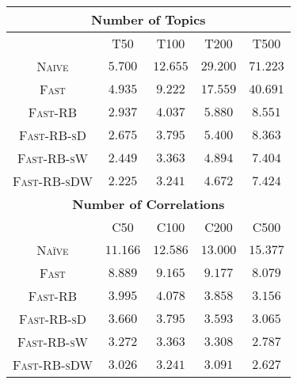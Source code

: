 \centering
  \begin{tabular}{| c || c | c | c | c |}
\hline
\multicolumn{5}{|c|}{{\bf Number of Topics}}\\
\hline
& T50 & T100 & T200 & T500\\
\hline
\scriptsize{\textsc{Naive}} & $5.700$ & $12.655$ & $29.200$ & $71.223$\\
\scriptsize{\textsc{Fast}} & $4.935$ & $9.222$ & $17.559$ & $40.691$\\
\scriptsize{\textsc{Fast-RB}} & $2.937$ & $4.037$ & $5.880$ & $8.551$\\
\scriptsize{\textsc{Fast-RB-sD}} & $2.675$ & $3.795$ & $5.400$ & $8.363$\\
\scriptsize{\textsc{Fast-RB-sW}} & $2.449$ & $3.363$ & $4.894$ & $7.404$\\
\scriptsize{\textsc{Fast-RB-sDW}} & $2.225$ & $3.241$ & $4.672$ & $7.424$\\
\hline
\multicolumn{5}{|c|}{{\bf Number of Correlations}}\\
\hline
& C50 & C100 & C200 & C500\\
\hline
\scriptsize{\textsc{Na\"ive}} & $11.166$ & $12.586$ & $13.000$ & $15.377$\\
\scriptsize{\textsc{Fast}} & $8.889$ & $9.165$ & $9.177$ & $8.079$\\
\scriptsize{\textsc{Fast-RB}} & $3.995$ & $4.078$ & $3.858$ & $3.156$\\
\scriptsize{\textsc{Fast-RB-sD}} & $3.660$ & $3.795$ & $3.593$ & $3.065$\\
\scriptsize{\textsc{Fast-RB-sW}} & $3.272$ & $3.363$ & $3.308$ & $2.787$\\
\scriptsize{\textsc{Fast-RB-sDW}} & $3.026$ & $3.241$ & $3.091$ & $2.627$\\
\hline
  \end{tabular}


\begin{frame}


\end{frame}

